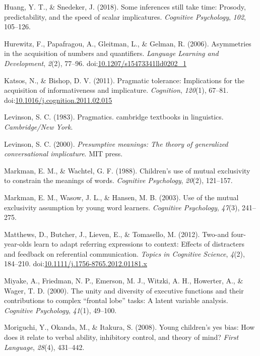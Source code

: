 \documentclass[man]{apa6}
\theoremstyle{definition}
\theoremstyle{definition}
\theoremstyle{definition}
\theoremstyle{remark}
\begin{document}
\hypertarget{ref-huang2018}{}
Huang, Y. T., \& Snedeker, J. (2018). Some inferences still take time:
Prosody, predictability, and the speed of scalar implicatures.
\emph{Cognitive Psychology}, \emph{102}, 105--126.

\hypertarget{ref-hurewitz2006}{}
Hurewitz, F., Papafragou, A., Gleitman, L., \& Gelman, R. (2006).
Asymmetries in the acquisition of numbers and quantifiers.
\emph{Language Learning and Development}, \emph{2}(2), 77--96.
doi:\href{https://doi.org/10.1207/s15473341lld0202_1}{10.1207/s15473341lld0202\_1}

\hypertarget{ref-katsos2011}{}
Katsos, N., \& Bishop, D. V. (2011). Pragmatic tolerance: Implications
for the acquisition of informativeness and implicature.
\emph{Cognition}, \emph{120}(1), 67--81.
doi:\href{https://doi.org/10.1016/j.cognition.2011.02.015}{10.1016/j.cognition.2011.02.015}

\hypertarget{ref-levinson1983}{}
Levinson, S. C. (1983). Pragmatics. cambridge textbooks in linguistics.
\emph{Cambridge/New York}.

\hypertarget{ref-levinson2000}{}
Levinson, S. C. (2000). \emph{Presumptive meanings: The theory of
generalized conversational implicature}. MIT press.

\hypertarget{ref-markman1988children}{}
Markman, E. M., \& Wachtel, G. F. (1988). Children's use of mutual
exclusivity to constrain the meanings of words. \emph{Cognitive
Psychology}, \emph{20}(2), 121--157.

\hypertarget{ref-markman2003use}{}
Markman, E. M., Wasow, J. L., \& Hansen, M. B. (2003). Use of the mutual
exclusivity assumption by young word learners. \emph{Cognitive
Psychology}, \emph{47}(3), 241--275.

\hypertarget{ref-matthews2012}{}
Matthews, D., Butcher, J., Lieven, E., \& Tomasello, M. (2012). Two-and
four-year-olds learn to adapt referring expressions to context: Effects
of distracters and feedback on referential communication. \emph{Topics
in Cognitive Science}, \emph{4}(2), 184--210.
doi:\href{https://doi.org/10.1111/j.1756-8765.2012.01181.x}{10.1111/j.1756-8765.2012.01181.x}

\hypertarget{ref-miyake2000unity}{}
Miyake, A., Friedman, N. P., Emerson, M. J., Witzki, A. H., Howerter,
A., \& Wager, T. D. (2000). The unity and diversity of executive
functions and their contributions to complex ``frontal lobe'' tasks: A
latent variable analysis. \emph{Cognitive Psychology}, \emph{41}(1),
49--100.

\hypertarget{ref-moriguchi2008young}{}
Moriguchi, Y., Okanda, M., \& Itakura, S. (2008). Young children's yes
bias: How does it relate to verbal ability, inhibitory control, and
theory of mind? \emph{First Language}, \emph{28}(4), 431--442.
\end{document}

